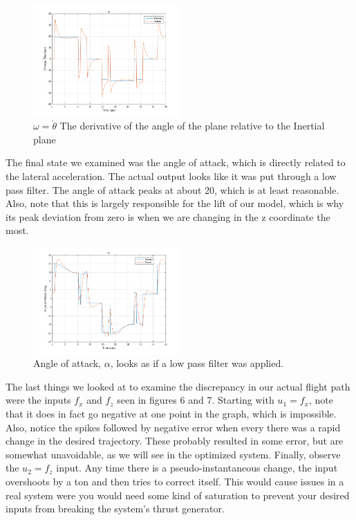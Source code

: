 \documentclass[journal]{IEEEtran}
\begin{document}
\begin{figure}[H]
    \centering
    \includegraphics[width=0.5\textwidth]{Omega_Constant_Gain_LQR.png}
    \caption{$\omega=\dot{\theta}$ The derivative of the angle of the plane relative to the Inertial plane}
\end{figure}
\indent The final state we examined was the angle of attack, which is directly related to the lateral acceleration. The actual output looks like it was put through a low pass filter. The angle of attack peaks at about 20, which is at least reasonable. Also, note that this is largely responsible for the lift of our model, which is why its peak deviation from zero is when we are changing in the z coordinate the most.
\begin{figure}[H]
    \centering
    \includegraphics[width=0.5\textwidth]{Alpha_Constant_Gain_LQR.png}
    \caption{Angle of attack, $\alpha$, looks as if a low pass filter was applied.}
\end{figure}
\indent The last things we looked at to examine the discrepancy in our actual flight path were the inputs $f_x$ and $f_z$ seen in figures 6 and 7. Starting with $u_1=f_x$, note that it does in fact go negative at one point in the graph, which is impossible. Also, notice the spikes followed by negative error when every there was a rapid change in the desired trajectory. These probably resulted in some error, but are somewhat unavoidable, as we will see in the optimized system. Finally,
observe the $u_2=f_z$ input. Any time there is a pseudo-instantaneous change, the input overshoots by a ton and then tries to correct itself. This would cause issues in a real system were you would need some kind of saturation to prevent your desired inputs from breaking the system's thrust generator.
\end{document}

